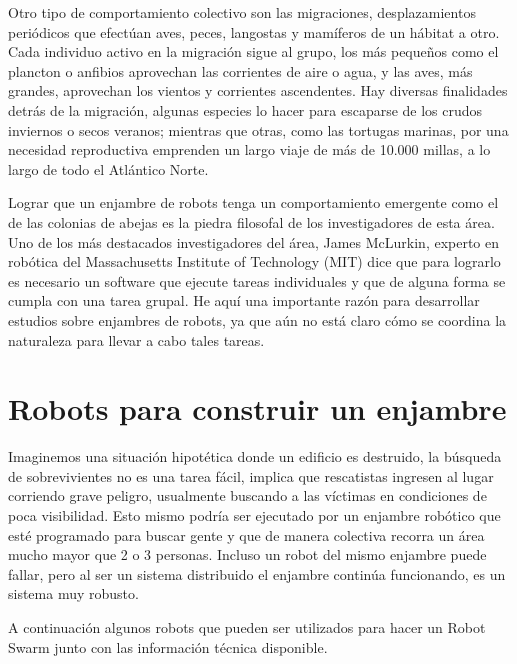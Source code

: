 Otro tipo de comportamiento colectivo son las migraciones, desplazamientos periódicos que efectúan aves, peces, langostas y mamíferos de un hábitat a otro. Cada individuo activo en la migración sigue al grupo, los más pequeños como el plancton o anfibios aprovechan las corrientes de aire o agua, y las aves, más grandes, aprovechan los vientos y corrientes ascendentes. Hay diversas finalidades detrás de la migración, algunas especies lo hacer para escaparse de los crudos inviernos o secos veranos; mientras que otras, como las tortugas marinas, por una necesidad reproductiva emprenden un largo viaje de más de 10.000 millas, a lo largo de todo el Atlántico Norte.

Lograr que un enjambre de robots tenga un comportamiento emergente como el de las colonias de abejas es la piedra filosofal de los investigadores de esta área. Uno de los más destacados investigadores del área, James McLurkin, experto en robótica del Massachusetts Institute of Technology (MIT) dice que para lograrlo es necesario un software que ejecute tareas individuales y     que de alguna forma se cumpla con una tarea grupal. He aquí una importante razón para desarrollar estudios sobre enjambres de robots, ya que aún no está claro cómo se coordina la naturaleza para llevar a cabo tales tareas.

\section{Robots para construir un enjambre}

Imaginemos una situación hipotética donde un edificio es destruido, la búsqueda de sobrevivientes no es una tarea fácil, implica que rescatistas ingresen al lugar corriendo grave peligro, usualmente buscando a las víctimas en condiciones de poca visibilidad. Esto mismo podría ser ejecutado por un enjambre robótico que esté programado para buscar gente y que de manera colectiva recorra un área mucho mayor que 2 o 3 personas. Incluso un robot del mismo enjambre puede fallar, pero al ser un sistema distribuido el enjambre continúa funcionando, es un sistema muy robusto.

A continuación algunos robots que pueden ser utilizados para hacer un Robot Swarm junto con las información técnica disponible.


